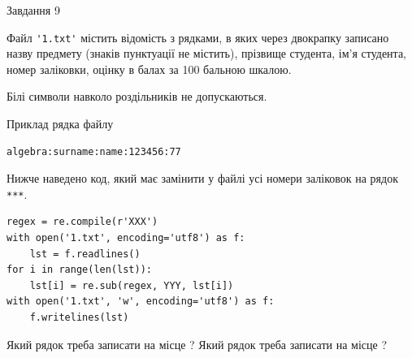 \documentclass[12pt, ukrainian]{article}
\def\code#1{\Verb!#1!}
\begin{document}
{\begin{minipage}[t]{8.0cm}
\end{minipage}

               
{\begin{center}Завдання {9}\end{center}}
\vspace{-4mm}
Файл \code{'1.txt'} містить відомість з рядками, в яких через двокрапку записа\-но назву предмету (знаків пунктуації не містить), прізвище студента, ім'я студента, номер залі\-ков\-ки, оцінку в балах за 100 бальною шкалою.

Білі символи навколо роздільників не допускаються.

Приклад рядка файлу



\begin{verbatim}
algebra:surname:name:123456:77
\end{verbatim}


Нижче наведено код, який має замінити у файлі усі номери заліковок на рядок \code{***}.



\begin{verbatim}
regex = re.compile(r'XXX')
with open('1.txt', encoding='utf8') as f:
    lst = f.readlines()
for i in range(len(lst)):
    lst[i] = re.sub(regex, YYY, lst[i])
with open('1.txt', 'w', encoding='utf8') as f:
    f.writelines(lst)
\end{verbatim}





Який рядок треба записати на місце  ?
Який рядок треба записати на місце  ?\par

}
\newpage
\end{document}
